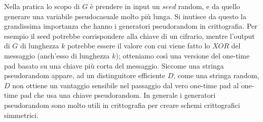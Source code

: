 \documentclass[a4paper,openright,twoside,12pt]{report}
\begin{document}
Nella pratica lo scopo di $G$ \`e prendere in input un $seed$ random, e da quello generare una variabile pseudocasuale molto pi\`u lunga. Si inutisce da questo la grandissima
importanza che hanno i generatori pseudorandom in crittografia. Per esempio il seed potrebbe corrispondere alla chiave di un cifrario, mentre l'output di $G$ di lunghezza $k$ potrebbe
essere il valore con cui viene fatto lo $XOR$ del messaggio (anch'esso di lunghezza $k$); otteniamo cos\`i una versione del one-time pad basato su una chiave pi\`u corta del messaggio.
Siccome una stringa pseudorandom appare, ad un distinguitore efficiente $D$, come una stringa random, $D$ non ottiene un vantaggio sensibile nel passaggio dal vero one-time pad
al one-time pad che usa una chiave pseudorandom. In generale i generatori pseudorandom sono molto utili in crittografia per creare schemi crittografici simmetrici.
\end{document}
